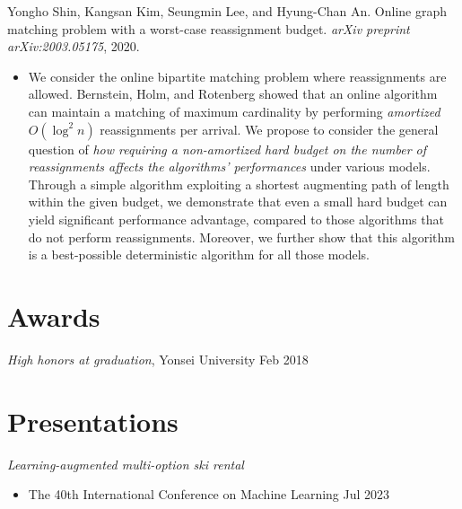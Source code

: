 \documentclass{cv}
\begin{document}
Yongho Shin, Kangsan Kim, Seungmin Lee, and Hyung-Chan An. Online graph matching problem with a worst-case reassignment budget. \emph{arXiv preprint arXiv:2003.05175}, 2020.
\vspace{\killinitspace}
\begin{itemize}
\item We consider the online bipartite matching problem where reassignments are allowed. Bernstein, Holm, and Rotenberg showed that an online algorithm can maintain a matching of maximum cardinality by performing \emph{amortized} $O(\log^2 n)$ reassignments per arrival. We propose to consider the general question of \emph{how requiring a \emph{non-amortized} hard budget on the number of reassignments affects the algorithms' performances} under various models. Through a simple algorithm exploiting a shortest augmenting path of length within the given budget, we demonstrate that even a small hard budget can yield significant performance advantage, compared to those algorithms that do not perform reassignments. Moreover, we further show that this algorithm is a best-possible deterministic algorithm for all those models.
\end{itemize}


\section{Awards}
\textsl{High honors at graduation}, Yonsei University \hfill Feb 2018

\section{Presentations}
\textsl{Learning-augmented multi-option ski rental}
\vspace{\killinitspace}
\begin{itemize}
\item The 40th International Conference on Machine Learning \hfill Jul 2023
\end{itemize}
\end{document}
